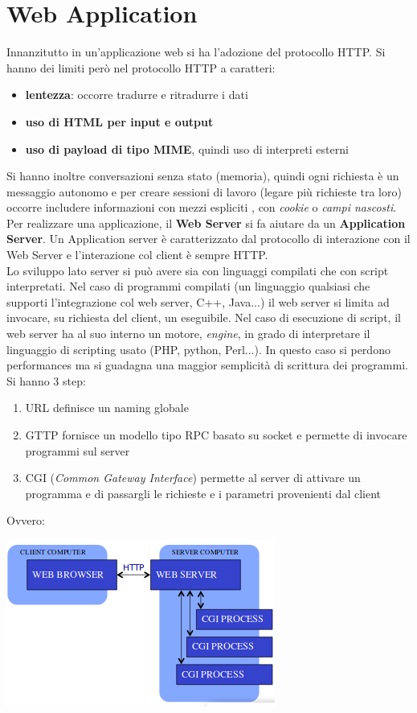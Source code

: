\message{ !name(sd.tex)}\documentclass[a4paper,12pt, oneside]{book}
\begin{document}
\section{Web Application}
Innanzitutto in un'applicazione web si ha l'adozione del protocollo HTTP. Si hanno dei limiti però nel protocollo HTTP a caratteri:
\begin{itemize}
	\item \textbf{lentezza}: occorre tradurre e ritradurre i dati 
	\item \textbf{uso di HTML per input e output}
	\item \textbf{uso di payload di tipo MIME}, quindi uso di interpreti esterni
\end{itemize}
Si hanno inoltre conversazioni senza stato (memoria), quindi ogni richiesta è un messaggio autonomo e per creare sessioni di lavoro (legare più richieste tra loro) occorre includere informazioni con mezzi espliciti , con \textit{cookie} o \textit{campi nascosti}.\\
Per realizzare una applicazione, il \textbf{Web Server} si fa aiutare da un \textbf{Application Server}. Un Application server è caratterizzato dal protocollo di interazione con il Web Server e l'interazione col client è sempre HTTP.\\
Lo sviluppo lato server si può avere sia con linguaggi compilati che con script interpretati. Nel caso di programmi compilati (un linguaggio qualsiasi che supporti l'integrazione col web server, C++, Java...) il web server si limita ad invocare, su richiesta del client, un eseguibile. Nel caso di esecuzione di script, il web server ha al suo interno un motore, \textit{engine}, in grado di interpretare il linguaggio di scripting usato (PHP, python, Perl...). In questo caso si perdono performances ma si guadagna una maggior semplicità di scrittura dei programmi.\\
Si hanno 3 step:
\begin{enumerate}
	\item URL definisce un naming globale
	\item GTTP fornisce un modello tipo RPC basato su socket e permette di invocare programmi sul server
	\item CGI (\textit{Common Gateway Interface}) permette al server di attivare un programma e di passargli le richieste e i parametri provenienti dal client 
\end{enumerate}
Ovvero:
\begin{center}
	\includegraphics[scale=0.7]{img/CGI.png}
\end{center}
\end{document}
